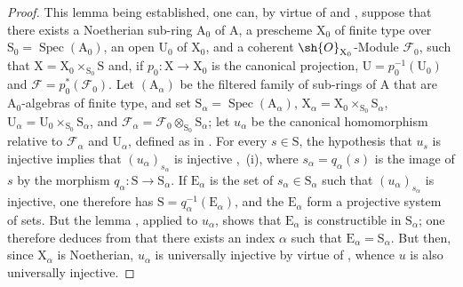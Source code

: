 \begin{proof}
This lemma being established, one can, by virtue of  and , suppose that there exists a Noetherian sub-ring $\mathrm{A}_0$ of $\mathrm{A}$, a prescheme $\mathrm{X}_0$ of finite type over $\mathrm{S}_0=\operatorname{Spec}(\mathrm{A}_0)$, an open $\mathrm{U}_0$ of $\mathrm{X}_0$, and a coherent $\sh{O}_{\mathrm{X}_0}$-Module $\mathscr{F}_0$, such that $\mathrm{X}=\mathrm{X}_0\times_{\mathrm{S}_0}\mathrm{S}$ and, if $p_0:\mathrm{X}\to\mathrm{X}_0$ is the canonical projection, $\mathrm{U}=p_0^{-1}(\mathrm{U}_0)$ and $\mathscr{F}=p_0^*(\mathscr{F}_0)$.
Let $(\mathrm{A}_\alpha)$ be the filtered family of sub-rings of $\mathrm{A}$ that are $\mathrm{A}_0$-algebras of finite type, and set $\mathrm{S}_\alpha=\operatorname{Spec}(\mathrm{A}_\alpha)$, $\mathrm{X}_\alpha=\mathrm{X}_0\times_{\mathrm{S}_0}\mathrm{S}_\alpha$, $\mathrm{U}_\alpha=\mathrm{U}_0\times_{\mathrm{S}_0}\mathrm{S}_\alpha$, and $\mathscr{F}_\alpha=\mathscr{F}_0\otimes_{\mathrm{S}_0}\mathrm{S}_\alpha$; let $u_\alpha$ be the canonical homomorphism relative to $\mathscr{F}_\alpha$ and $\mathrm{U}_\alpha$, defined as in .
For every $s\in\mathrm{S}$, the hypothesis that $u_s$ is injective implies that $(u_\alpha)_{s_\alpha}$ is injective ,~(i), where $s_\alpha=q_\alpha(s)$ is the image of $s$ by the morphism $q_\alpha:\mathrm{S}\to\mathrm{S}_\alpha$.
If $\mathrm{E}_\alpha$ is the set of $s_\alpha\in\mathrm{S}_\alpha$ such that $(u_\alpha)_{s_\alpha}$ is injective, one therefore has $\mathrm{S}=q_\alpha^{-1}(\mathrm{E}_\alpha)$, and the $\mathrm{E}_\alpha$ form a projective system of sets.
But the lemma , applied to $u_\alpha$, shows that $\mathrm{E}_\alpha$ is constructible in $\mathrm{S}_\alpha$; one therefore deduces from  that there exists an index $\alpha$ such that $\mathrm{E}_\alpha=\mathrm{S}_\alpha$.
But then, since $\mathrm{X}_\alpha$ is Noetherian, $u_\alpha$ is universally injective by virtue of , whence $u$ is also universally injective.
\medskip


\end{proof}
